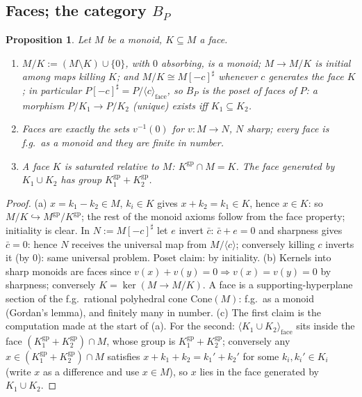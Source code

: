 \documentclass[11pt]{article}
\newtheorem{proposition}[theorem]{Proposition}
\theoremstyle{definition}
\newcommand{\gp}{\mathrm{gp}}
\newcommand{\Cone}{\mathrm{Cone}}
\begin{document}
\subsection{Faces; the category $B_P$}

\begin{proposition}\label{prop:bp}
Let $M$ be a monoid, $K\subseteq M$ a face.
\begin{enumerate}[label=\textup{(\alph*)},leftmargin=1.8em]
\item $M/K:=(M\setminus K)\cup\{0\}$, with $0$ absorbing, is a monoid;
$M\to M/K$ is initial among maps killing $K$; and
$M/K\cong M[-c]^{\sharp}$ whenever $c$ generates the face $K$; in
particular $P[-c]^{\sharp}=P/\langle c\rangle_{\mathrm{face}}$, so
$B_P$ is the poset of faces of $P$: a morphism $P/K_1\to P/K_2$
\textup{(}unique\textup{)} exists iff $K_1\subseteq K_2$.
\item Faces are exactly the sets $v^{-1}(0)$ for $v:M\to N$, $N$
sharp; every face is f.g.\ as a monoid and they are finite in number.
\item A face $K$ is saturated relative to $M$: $K^{\gp}\cap M=K$. The
face generated by $K_1\cup K_2$ has group $K_1^{\gp}+K_2^{\gp}$.
\end{enumerate}
\end{proposition}

\begin{proof}
(a) $x=k_1-k_2\in M$, $k_i\in K$ gives $x+k_2=k_1\in K$, hence
$x\in K$: so $M/K\hookrightarrow M^{\gp}/K^{\gp}$; the rest of the
monoid axioms follow from the face property; initiality is clear.
In $N:=M[-c]^{\sharp}$ let $e$ invert $\bar c$: $\bar c+e=0$ and
sharpness gives $\bar c=0$: hence $N$ receives the universal map from
$M/\langle c\rangle$; conversely killing $c$ inverts it (by $0$): same
universal problem. Poset claim: by initiality.
(b) Kernels into sharp monoids are faces since $v(x)+v(y)=0\Rightarrow
v(x)=v(y)=0$ by sharpness; conversely $K=\ker(M\to M/K)$. A face is a
supporting-hyperplane section of the f.g.\ rational polyhedral cone
$\Cone(M)$: f.g.\ as a monoid (Gordan's lemma), and finitely many in
number.
(c) The first claim is the computation made at the start of (a).
For the second: $\langle K_1\cup K_2\rangle_{\mathrm{face}}$ sits
inside the face $(K_1^{\gp}+K_2^{\gp})\cap M$, whose group is
$K_1^{\gp}+K_2^{\gp}$; conversely any $x\in(K_1^{\gp}+K_2^{\gp})\cap
M$ satisfies $x+k_1+k_2=k_1'+k_2'$ for some $k_i,k_i'\in K_i$ (write
$x$ as a difference and use $x\in M$), so $x$ lies in the face
generated by $K_1\cup K_2$.
\end{proof}
\end{document}
